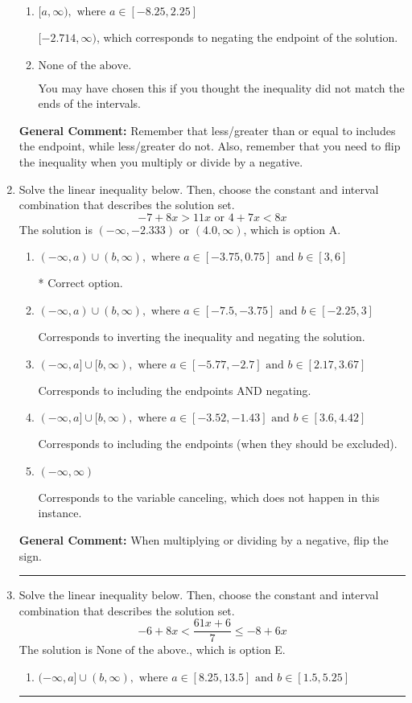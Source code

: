 \documentclass{extbook}[14pt]
\newcommand{\litem}[1]{\item #1

\rule{\textwidth}{0.4pt}}
\begin{document}
\begin{enumerate}
{\begin{enumerate}[label=\Alph*.]
 $(-\infty, 2.714]$, which corresponds to switching the direction of the interval. You likely did this if you did not flip the inequality when dividing by a negative!
\item \( [a, \infty), \text{ where } a \in [-8.25, 2.25] \)

 $[-2.714, \infty)$, which corresponds to negating the endpoint of the solution.
\item \( \text{None of the above}. \)

You may have chosen this if you thought the inequality did not match the ends of the intervals.
\end{enumerate}

\textbf{General Comment:} Remember that less/greater than or equal to includes the endpoint, while less/greater do not. Also, remember that you need to flip the inequality when you multiply or divide by a negative.
}
\litem{
Solve the linear inequality below. Then, choose the constant and interval combination that describes the solution set.
\[ -7 + 8 x > 11 x \text{ or } 4 + 7 x < 8 x \]The solution is \( (-\infty, -2.333) \text{ or } (4.0, \infty) \), which is option A.\begin{enumerate}[label=\Alph*.]
\item \( (-\infty, a) \cup (b, \infty), \text{ where } a \in [-3.75, 0.75] \text{ and } b \in [3, 6] \)

 * Correct option.
\item \( (-\infty, a) \cup (b, \infty), \text{ where } a \in [-7.5, -3.75] \text{ and } b \in [-2.25, 3] \)

Corresponds to inverting the inequality and negating the solution.
\item \( (-\infty, a] \cup [b, \infty), \text{ where } a \in [-5.77, -2.7] \text{ and } b \in [2.17, 3.67] \)

Corresponds to including the endpoints AND negating.
\item \( (-\infty, a] \cup [b, \infty), \text{ where } a \in [-3.52, -1.43] \text{ and } b \in [3.6, 4.42] \)

Corresponds to including the endpoints (when they should be excluded).
\item \( (-\infty, \infty) \)

Corresponds to the variable canceling, which does not happen in this instance.
\end{enumerate}

\textbf{General Comment:} When multiplying or dividing by a negative, flip the sign.
}
\litem{
Solve the linear inequality below. Then, choose the constant and interval combination that describes the solution set.
\[ -6 + 8 x < \frac{61 x + 6}{7} \leq -8 + 6 x \]The solution is \( \text{None of the above.} \), which is option E.\begin{enumerate}[label=\Alph*.]
\item \( (-\infty, a] \cup (b, \infty), \text{ where } a \in [8.25, 13.5] \text{ and } b \in [1.5, 5.25] \)


\end{enumerate}}
\end{enumerate}
\end{document}
